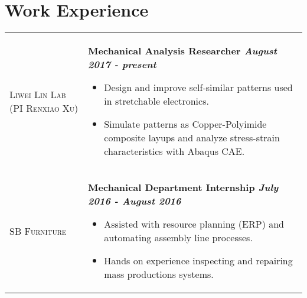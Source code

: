 \documentclass[letterpaper, 10pt]{article}
\begin{document}
\section{Work Experience}

\begin{flushleft}
  \begin{tabular}{>{\raggedright}p{1.3in} @{\hskip .2in} l}
      \textsc{Liwei Lin Lab (PI Renxiao Xu)} & \parbox[t]{5.75in}{\textbf{Mechanical Analysis Researcher \hfill\textit{August 2017 - present}} \begin{itemize}
      \item Design and improve self-similar patterns used in stretchable electronics.
      \item Simulate patterns as Copper-Polyimide composite layups and analyze stress-strain characteristics with Abaqus CAE.
      \end{itemize}} \medskip \\
      \textsc{SB Furniture}   & \parbox[t]{5.75in}{\textbf{Mechanical Department Internship \hfill\textit{July 2016 - August 2016}} \begin{itemize}
      \item Assisted with resource planning (ERP) and automating assembly line processes.
      \item Hands on experience inspecting and repairing mass productions systems.
      \end{itemize}} \medskip \\
  \end{tabular}
\end{flushleft}
\end{document}
